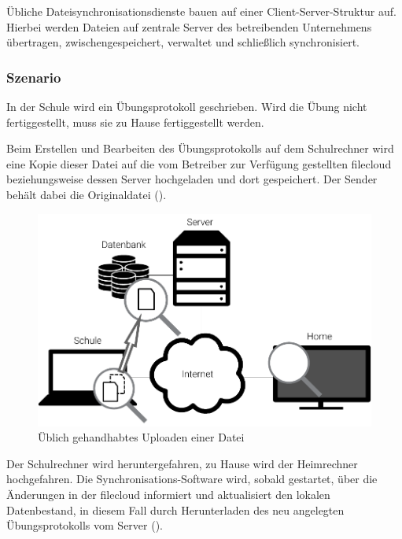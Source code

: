 Übliche Dateisynchronisationsdienste bauen auf einer Client-Server-Struktur auf.
Hierbei werden Dateien auf zentrale Server des betreibenden
Unternehmens übertragen, zwischengespeichert, verwaltet und schließlich
synchronisiert.

\subsubsection{Szenario}
In der Schule wird ein Übungsprotokoll geschrieben. Wird die Übung nicht
fertiggestellt, muss sie zu Hause fertiggestellt werden.

Beim Erstellen und Bearbeiten des Übungsprotokolls auf dem Schulrechner
wird eine Kopie dieser Datei auf die vom Betreiber zur Verfügung gestellten
\gls{filecloud} beziehungsweise dessen Server hochgeladen und dort gespeichert.
Der Sender behält dabei die Originaldatei ().
\begin{figure}[htb]
	\centering
  \includegraphics[]{images/dropbox_upload}
  \caption{Üblich gehandhabtes Uploaden einer Datei}
	\label{dropbox_upload}
\end{figure}

Der Schulrechner wird heruntergefahren, zu Hause wird der Heimrechner hochgefahren. Die Synchronisations-Software wird,
sobald gestartet, über die Änderungen in der \gls{filecloud} informiert und aktualisiert den lokalen Datenbestand, in
diesem Fall durch Herunterladen des neu angelegten Übungsprotokolls vom Server ().

